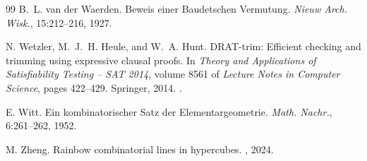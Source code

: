\documentclass[12pt]{article}
\begin{document}
\begin{thebibliography}{99}
B.~L. van der Waerden. Beweis einer Baudetschen Vermutung. \emph{Nieuw
Arch. Wisk.}, 15:212--216, 1927.

N. Wetzler, M.~J.~H. Heule, and W.~A. Hunt. {DRAT}-trim: Efficient
checking and trimming using expressive clausal proofs. In \emph{Theory
and Applications of Satisfiability Testing -- SAT 2014}, volume 8561
of \emph{Lecture Notes in Computer Science}, pages 422--429.
Springer, 2014. .

E. Witt. Ein kombinatorischer Satz der Elementargeometrie.
\emph{Math. Nachr.}, 6:261--262, 1952.

M. Zheng. Rainbow combinatorial lines in hypercubes.
, 2024.

\end{thebibliography}
\end{document}
